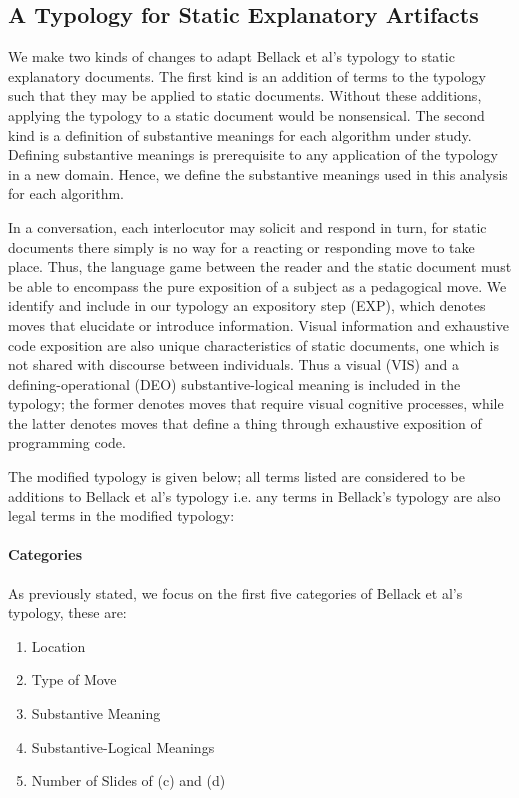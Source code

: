 \documentclass[conference]{IEEEtran}
\begin{document}
\subsection{A Typology for Static Explanatory Artifacts}
We make two kinds of changes to adapt Bellack et al's typology to static
explanatory documents. The first kind is an addition of terms to the typology
such that they may be applied to static documents. Without these additions,
applying the typology to a static document would be nonsensical. The second kind
is a definition of substantive meanings for each algorithm under study.
Defining substantive meanings is prerequisite to any application of the typology
in a new domain. Hence, we define the substantive meanings used in this analysis
for each algorithm.

In a conversation, each interlocutor may solicit and respond in turn, for static
documents there simply is no way for a reacting or responding move to take
place. Thus, the language game between the reader and the static document must
be able to encompass the pure exposition of a subject as a pedagogical move. We
identify and include in our typology an expository step (EXP), which denotes
moves that elucidate or introduce information. Visual information and exhaustive
code exposition are also unique characteristics of static documents, one which
is not shared with discourse between individuals. Thus a visual (VIS) and a
defining-operational (DEO) substantive-logical meaning is included in the
typology; the former denotes moves that require visual cognitive processes,
while the latter denotes moves that define a thing through exhaustive exposition
of programming code.

The modified typology is given below; all terms listed are considered to be additions to
Bellack et al's typology i.e. any terms in Bellack's typology are also
legal terms in the modified typology:

\paragraph{Categories}
As previously stated, we focus on the first five categories of Bellack et al's
typology, these are:
\begin{enumerate}
  \item Location
  \item Type of Move
  \item Substantive Meaning
  \item Substantive-Logical Meanings
  \item Number of Slides of (c) and (d)
\end{enumerate}
\end{document}
